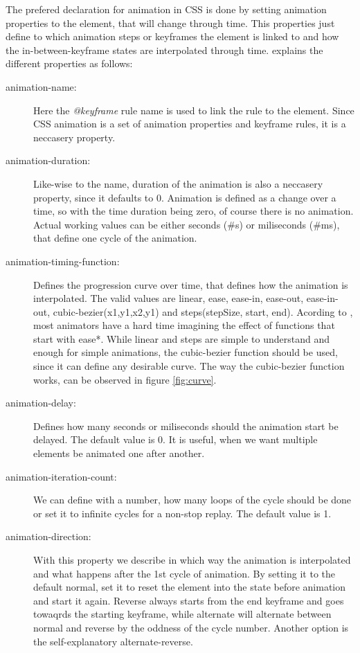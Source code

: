 The prefered declaration for animation in CSS is done by setting animation properties to the element, that will change through time. This properties just define to which animation steps or keyframes the element is linked to and how the in-between-keyframe states are interpolated through time. \citet{w3schoolAnime} explains the different properties as follows:

\begin{description}
\item [animation-name:] Here the {\em{}@keyframe} rule name is used to link the rule to the element. Since CSS animation is a set of animation properties and keyframe rules, it is a neccasery property.
\item [animation-duration:] Like-wise to the name, duration of the animation is also a neccasery property, since it defaults to 0. Animation is defined as a change over a time, so with the time duration being zero, of course there is no animation. Actual working values can be either seconds (\#s) or miliseconds (\#ms), that define one cycle of the animation.
\item [animation-timing-function:] Defines the progression curve over time, that defines how the animation is interpolated. The valid values are linear, ease, ease-in, ease-out, ease-in-out, cubic-bezier(x1,y1,x2,y1) and steps(stepSize, start, end). Acording to \citet{head2016designing}, most animators have a hard time imagining the effect of functions that start with ease*. While linear and steps are simple to understand and enough for simple animations, the cubic-bezier function should be used, since it can define any desirable curve. The way the cubic-bezier function works, can be observed in figure \ref{fig:curve}.
\item [animation-delay:] Defines how many seconds or miliseconds should the animation start be delayed. The default value is 0. It is useful, when we want multiple elements be animated one after another.
\item [animation-iteration-count:] We can define with a number, how many loops of the cycle should be done or set it to infinite cycles for a non-stop replay. The default value is 1.
\item [animation-direction:] With this property we describe in which way the animation is interpolated and what happens after the 1st cycle of animation. By setting it to the default normal, set it to reset the element into the state before animation and start it again. Reverse always starts from the end keyframe and goes towaqrds the starting keyframe, while alternate will alternate between normal and reverse by the oddness of the cycle number. Another option is the self-explanatory alternate-reverse.

\end{description}
